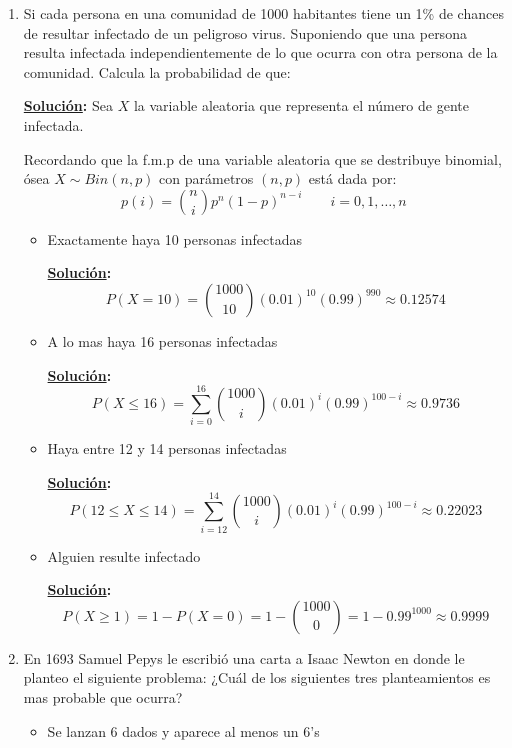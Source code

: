 \documentclass[11pt,letterpaper]{report}
\newcommand{\sol}{\textbf{\underline{Solución}: }} %
\begin{document}
\begin{enumerate}

\item Si cada persona en una comunidad de 1000 habitantes tiene un 1\% de chances de resultar
infectado de un peligroso virus. Suponiendo que una persona resulta infectada independientemente de
lo que ocurra con otra persona de la comunidad. Calcula la probabilidad de que:

\sol Sea $X$ la variable aleatoria que representa el número de gente infectada.

Recordando que la f.m.p de una variable aleatoria que se destribuye binomial, ósea $X \sim Bin(n,p)$ con
parámetros $(n,p)$ está dada por:
\[
    p(i) = \binom{n}{i} p^n (1-p)^{n-i} \qquad i = 0,1,\ldots,n
\]


\begin{itemize}
    \item Exactamente haya 10 personas infectadas
    
    \sol
    $$P(X=10) = \binom{1000}{10} (0.01)^10 (0.99)^{990} \approx 0.12574$$
    
    \item A lo mas haya 16 personas infectadas
    
    \sol
    $$P(X \leq 16) = \sum_{i=0}^{16} \binom{1000}{i} (0.01)^i (0.99)^{100-i} \approx 0.9736$$

    \item Haya entre 12 y 14 personas infectadas
    
    \sol
    $$P(12 \leq X \leq 14) = \sum_{i=12}^{14} \binom{1000}{i} (0.01)^i (0.99)^{100-i} \approx 0.22023$$

    \item Alguien resulte infectado
    
    \sol
    $$P(X \geq 1) = 1 - P(X = 0) = 1 - \binom{1000}{0} = 1 - 0.99^{1000} \approx 0.9999$$

\end{itemize}

\item En 1693 Samuel Pepys le escribió una carta a Isaac Newton en donde le planteo el siguiente
problema: ¿Cuál de los siguientes tres planteamientos es mas probable que ocurra?
\begin{itemize}
    
    \item Se lanzan 6 dados y aparece al menos un 6's
    

\end{itemize}
\end{enumerate}
\end{document}
